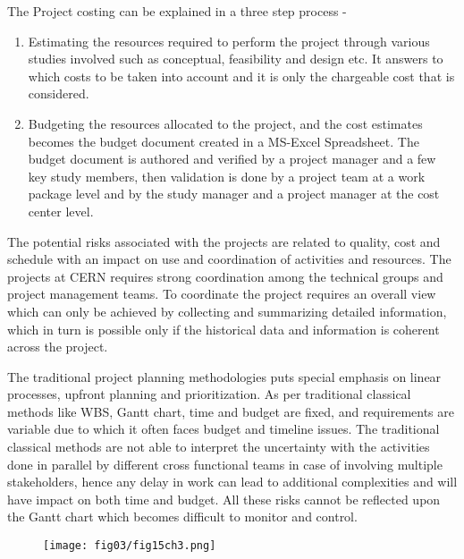 The Project costing can be explained in a three step process - 

\begin{enumerate}
	\item Estimating the resources required to perform the project through various studies involved such as conceptual, feasibility and design etc. It answers to which costs to be taken into account and it is only  the chargeable cost that is considered. 
	
	\item Budgeting the resources allocated to the project, and the cost estimates becomes the budget document created in a MS-Excel Spreadsheet. The budget document is authored and verified by a project manager and a few key study members, then validation is done by a project team at a work package level and by the study manager and a project manager at the cost center level.
\end{enumerate}

The potential risks associated with the projects are related to quality, cost and schedule with an impact on use and coordination of activities and resources. The projects at CERN requires strong coordination among the technical groups and project management teams. To coordinate the project requires an overall view which can only be achieved by collecting and summarizing detailed information, which in turn is possible only if the historical data and information is coherent across the project.

The traditional project planning methodologies puts special emphasis on linear processes, upfront planning and prioritization. As per traditional classical methods like WBS, Gantt chart, time and budget are fixed, and requirements are variable due to which it often faces budget and timeline issues. The traditional classical methods are not able to interpret the uncertainty with the activities done in parallel by different cross functional teams in case of involving multiple stakeholders, hence any delay in work can lead to additional complexities and will have impact on both time and budget. All these risks cannot be reflected upon the Gantt chart which becomes difficult to monitor and control. 

	\begin{figure}
	\centering
	\texttt{[image: fig03/fig15ch3.png]}
\end{figure}


